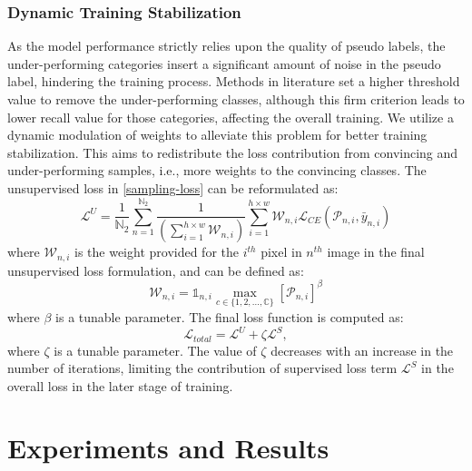 \documentclass[runningheads]{llncs}
\begin{document}
\subsubsection{Dynamic Training Stabilization}
As the model performance strictly relies upon the quality of pseudo labels, the under-performing categories insert a significant amount of noise in the pseudo label, hindering the training process. Methods in literature \cite{ke2020guided} set a higher threshold value to remove the under-performing classes, although this firm criterion leads to lower recall value for those categories, affecting the overall training. We utilize a dynamic modulation of weights to alleviate this problem for better training stabilization. This aims to redistribute the loss contribution from convincing and under-performing samples, i.e., more weights to the convincing classes. The unsupervised loss in \autoref{sampling-loss} can be reformulated as:
\begin{equation}
    \mathcal{L}^U = \frac{1}{\mathbb{N}_2}\sum\limits_{n=1}^{\mathbb{N}_2}   \frac{1}{\left(\sum\limits_{i=1}^{h\times w}  \mathcal{W}_{n,i}  \right)} \sum\limits_{i=1}^{h\times w} \mathcal{W}_{n,i}\mathcal{L}_{CE}(\mathcal{P}_{n,i}, \bar{{y}}_{n,i})
\end{equation}
where $\mathcal{W}_{n,i}$ is the weight provided for the $i^{th}$ pixel in $n^{th}$ image in the final unsupervised loss formulation, and can be defined as:
\begin{equation}\label{w_ni}
    \mathcal{W}_{n,i} = \mathds{1}_{n,i}\max\limits_{c\in\{1,2,...,\mathbb{C}\}}[\mathcal{P}_{n,i}]^\beta
\end{equation}
where $\beta$ is a tunable parameter. The final loss function is computed as:
\begin{equation}
    \mathcal{L}_{total} = \mathcal{L}^U+\zeta\mathcal{L}^S,
\end{equation}
where $\zeta$ is a tunable parameter. The value of $\zeta$ decreases with an increase in the number of iterations, limiting the contribution of supervised loss term $\mathcal{L}^S$ in the overall loss in the later stage of training.   


\section{Experiments and Results}\label{results}
\end{document}
